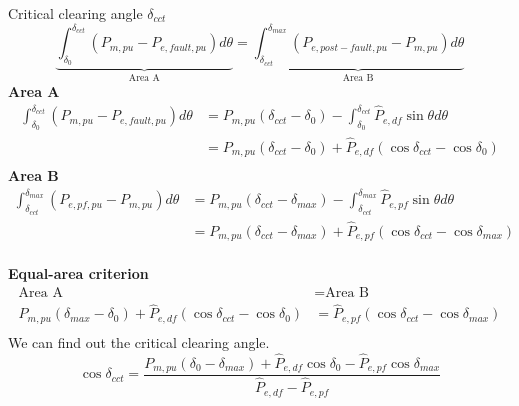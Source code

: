 \begin{frame}[allowframebreaks]{Critical clearing angle $\delta_{cct}$}
$$\underbrace{\int_{\delta_0}^{\delta_{cct}} \left(P_{m,pu}-P_{e,fault,pu}\right) d\theta}_{\text{Area A}} = \underbrace{\int_{\delta_{cct}}^{\delta_{max}} \left(P_{e,post-fault,pu}-P_{m,pu}\right) d\theta}_{\text{Area B}}$$
\textbf{Area A}
$$
\begin{aligned}
\int_{\delta_{0}}^{\delta_{cct}} \left(P_{m,pu}-P_{e,fault,pu}\right) d\theta &= P_{m,pu} \left(\delta_{cct} - \delta_{0}\right) - \int_{\delta_{0}}^{\delta_{cct}} \hat{P}_{e,df} \sin \theta d\theta \\
&=P_{m,pu} \left(\delta_{cct} - \delta_{0}\right) + \hat{P}_{e,df} \left(\cos \delta_{cct} -\cos \delta_{0}\right) \\
\end{aligned}
$$
\textbf{Area B}
$$
\begin{aligned}
\int_{\delta_{cct}}^{\delta_{max}} \left(P_{e,pf,pu}-P_{m,pu}\right) d\theta &= P_{m,pu} \left(\delta_{cct} - \delta_{max}\right) - \int_{\delta_{cct}}^{\delta_{max}} \hat{P}_{e,pf} \sin \theta d\theta \\
&=P_{m,pu} \left(\delta_{cct} - \delta_{max}\right) + \hat{P}_{e,pf} \left(\cos \delta_{cct} -\cos \delta_{max}\right) \\
\end{aligned}
$$

\textbf{Equal-area criterion}
$$
\begin{aligned}
\text{Area A} &= \text{Area B}\\
P_{m,pu} \left(\delta_{max} - \delta_{0}\right) + \hat{P}_{e,df} \left(\cos \delta_{cct} - \cos \delta_{0}\right) &= \hat{P}_{e,pf} \left(\cos \delta_{cct} - \cos \delta_{max}\right) \\
\end{aligned}
$$
We can find out the critical clearing angle.
$$
\cos \delta_{cct} = \frac{P_{m,pu} \left(\delta_{0} - \delta_{max}\right) + \hat{P}_{e,df} \cos \delta_{0} - \hat{P}_{e,pf} \cos \delta_{max}}{\hat{P}_{e,df} - \hat{P}_{e,pf}}
$$



\end{frame}
